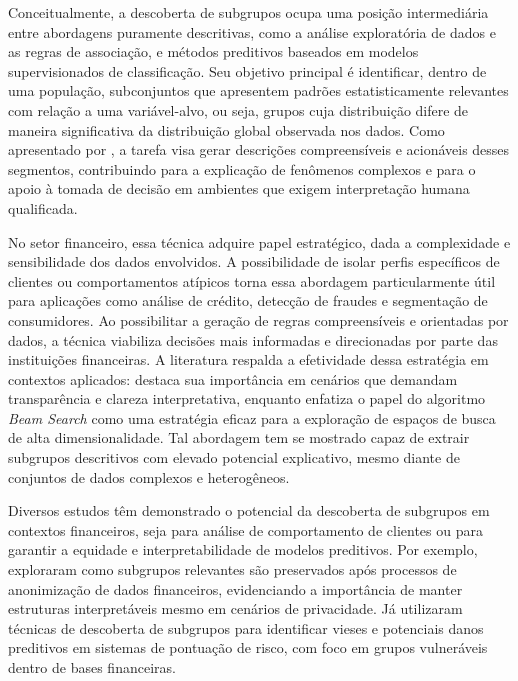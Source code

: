\documentclass[12pt]{article}
\begin{document}
Conceitualmente, a descoberta de subgrupos ocupa uma posição intermediária entre abordagens puramente descritivas, como a análise exploratória de dados e as regras de associação, e métodos preditivos baseados em modelos supervisionados de classificação. Seu objetivo principal é identificar, dentro de uma população, subconjuntos que apresentem padrões estatisticamente relevantes com relação a uma variável-alvo, ou seja, grupos cuja distribuição difere de maneira significativa da distribuição global observada nos dados. Como apresentado por \cite{gamberger:02}, a tarefa visa gerar descrições compreensíveis e acionáveis desses segmentos, contribuindo para a explicação de fenômenos complexos e para o apoio à tomada de decisão em ambientes que exigem interpretação humana qualificada.

No setor financeiro, essa técnica adquire papel estratégico, dada a complexidade e sensibilidade dos dados envolvidos. A possibilidade de isolar perfis específicos de clientes ou comportamentos atípicos torna essa abordagem particularmente útil para aplicações como análise de crédito, detecção de fraudes e segmentação de consumidores. Ao possibilitar a geração de regras compreensíveis e orientadas por dados, a técnica viabiliza decisões mais informadas e direcionadas por parte das instituições financeiras. A literatura respalda a efetividade dessa estratégia em contextos aplicados: \cite{herrera:10} destaca sua importância em cenários que demandam transparência e clareza interpretativa, enquanto \cite{atzmueller:15} enfatiza o papel do algoritmo \textit{Beam Search} como uma estratégia eficaz para a exploração de espaços de busca de alta dimensionalidade. Tal abordagem tem se mostrado capaz de extrair subgrupos descritivos com elevado potencial explicativo, mesmo diante de conjuntos de dados complexos e heterogêneos.

Diversos estudos têm demonstrado o potencial da descoberta de subgrupos em contextos financeiros, seja para análise de comportamento de clientes ou para garantir a equidade e interpretabilidade de modelos preditivos. Por exemplo, \cite{maina:19} exploraram como subgrupos relevantes são preservados após processos de anonimização de dados financeiros, evidenciando a importância de manter estruturas interpretáveis mesmo em cenários de privacidade. Já \cite{dubowski:21} utilizaram técnicas de descoberta de subgrupos para identificar vieses e potenciais danos preditivos em sistemas de pontuação de risco, com foco em grupos vulneráveis dentro de bases financeiras.
\end{document}
